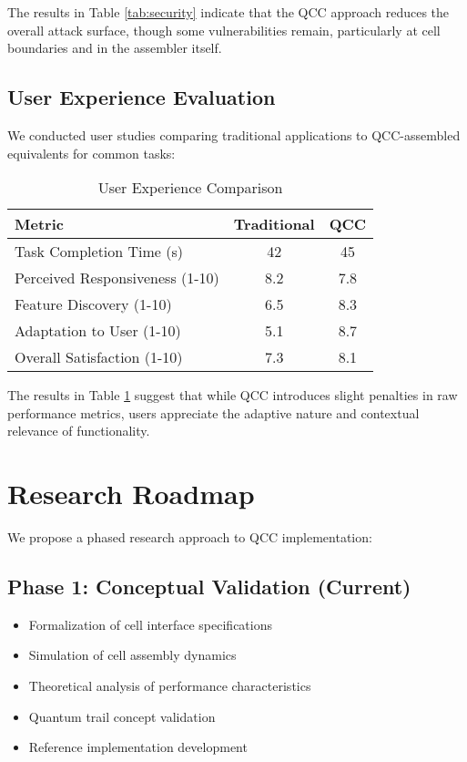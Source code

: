 \documentclass[11pt,a4paper]{article}
\begin{document}
The results in Table \ref{tab:security} indicate that the QCC approach reduces the overall attack surface, though some vulnerabilities remain, particularly at cell boundaries and in the assembler itself.

\subsection{User Experience Evaluation}

We conducted user studies comparing traditional applications to QCC-assembled equivalents for common tasks:

\begin{table}[h]
\centering
\begin{tabular}{|l|c|c|}
\hline
\textbf{Metric} & \textbf{Traditional} & \textbf{QCC} \\
\hline
Task Completion Time (s) & 42 & 45 \\
Perceived Responsiveness (1-10) & 8.2 & 7.8 \\
Feature Discovery (1-10) & 6.5 & 8.3 \\
Adaptation to User (1-10) & 5.1 & 8.7 \\
Overall Satisfaction (1-10) & 7.3 & 8.1 \\
\hline
\end{tabular}
\caption{User Experience Comparison}
\label{tab:ux}
\end{table}

The results in Table \ref{tab:ux} suggest that while QCC introduces slight penalties in raw performance metrics, users appreciate the adaptive nature and contextual relevance of functionality.

\section{Research Roadmap}

We propose a phased research approach to QCC implementation:

\subsection{Phase 1: Conceptual Validation (Current)}

\begin{itemize}
    \item Formalization of cell interface specifications
    \item Simulation of cell assembly dynamics
    \item Theoretical analysis of performance characteristics
    \item Quantum trail concept validation
    \item Reference implementation development
\end{itemize}
\end{document}
